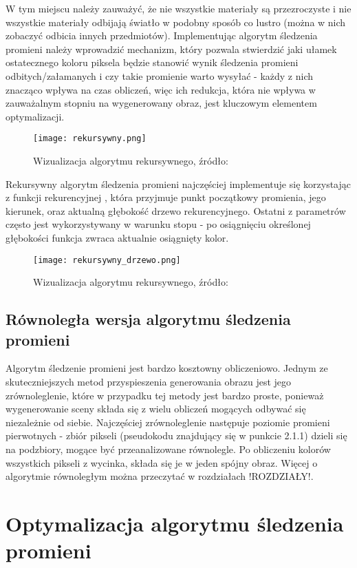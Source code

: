 W tym miejscu należy zauważyć, że nie wszystkie materiały są przezroczyste i nie wszystkie materiały odbijają światło w podobny sposób co lustro (można w nich zobaczyć odbicia innych przedmiotów). Implementując algorytm śledzenia promieni należy wprowadzić mechanizm, który pozwala stwierdzić jaki ułamek ostatecznego koloru piksela będzie stanowić wynik śledzenia promieni odbitych/załamanych i czy takie promienie warto wysyłać - każdy z nich znacząco wpływa na czas obliczeń, więc ich redukcja, która nie wpływa w zauważalnym stopniu na wygenerowany obraz, jest kluczowym elementem optymalizacji.


\begin{figure}[h!]
\centering
  \caption{Wizualizacja algorytmu rekursywnego, źródło: \cite{scratch}}
  \texttt{[image: rekursywny.png]}
\end{figure}

Rekursywny algorytm śledzenia promieni najczęściej implementuje się korzystając z funkcji rekurencyjnej \cite{suffern2007}, która przyjmuje punkt początkowy promienia, jego kierunek, oraz aktualną głębokość drzewo rekurencyjnego. Ostatni z parametrów często jest wykorzystywany w warunku stopu - po osiągnięciu określonej głębokości funkcja zwraca aktualnie osiągnięty kolor.


\begin{figure}[h!]
\centering
  \caption{Wizualizacja algorytmu rekursywnego, źródło: \cite{scratch}}
  \texttt{[image: rekursywny\_drzewo.png]}
\end{figure}


\subsection{Równoległa wersja algorytmu śledzenia promieni}

Algorytm śledzenie promieni jest bardzo kosztowny obliczeniowo. Jednym ze skuteczniejszych metod przyspieszenia generowania obrazu jest jego zrównoleglenie, które w przypadku tej metody jest bardzo proste, ponieważ wygenerowanie sceny składa się z wielu obliczeń mogących odbywać się niezależnie od siebie. Najczęściej zrównoleglenie następuje poziomie promieni pierwotnych - zbiór pikseli (pseudokodu znajdujący się w punkcie 2.1.1) dzieli się na podzbiory, mogące być przeanalizowane równolegle. Po obliczeniu kolorów wszystkich pikseli z wycinka, składa się je w jeden spójny obraz. Więcej o algorytmie równoległym można przeczytać w rozdziałach !ROZDZIAŁY!.

\section{Optymalizacja algorytmu śledzenia promieni}

